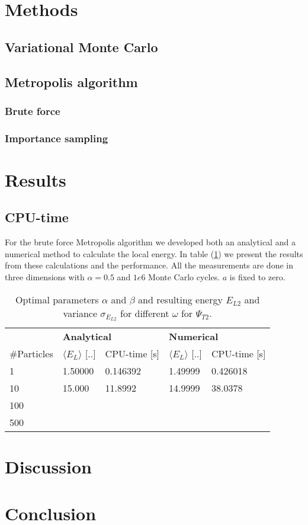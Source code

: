 \documentclass[norsk,a4paper,12pt]{article}
\begin{document}
\section{Methods}
\subsection{Variational Monte Carlo}\label{VMC}

\subsection{Metropolis algorithm}
\subsubsection{Brute force}
\subsubsection{Importance sampling}



\section{Results}
\subsection{CPU-time}\label{CPU}
For the brute force Metropolis algorithm we developed both an analytical and a numerical method to calculate the local energy. In table (\ref{tab:BFmet}) we present the results from these calculations and the performance. All the measurements are done in three dimensions with $\alpha=0.5$ and $1e6$ Monte Carlo cycles. $a$ is fixed to zero.
\begin{table} [H]
\centering
\caption{Optimal parameters $\alpha$ and $\beta$ and resulting energy $E_{L2}$ and variance $\sigma_{E_{L2}}$ for different $\omega$ for $\Psi_{T2}$.}
\begin{tabularx}{\textwidth}{X|XX|XX} \hline
\label{tab:BFmet}
& \multicolumn{2}{X}{\textbf{Analytical}} & \multicolumn{2}{X}{\textbf{Numerical}} \\
\#Particles & $\langle E_L\rangle$ [..] & CPU-time [s] & $\langle E_L\rangle$ [..] & CPU-time [s]\\ \hline
1 & 1.50000 & 0.146392 & 1.49999 & 0.426018 \\
10 & 15.000 & 11.8992 & 14.9999 & 38.0378 \\
100 & & & & \\
500 & & & & \\ \hline
\end{tabularx}
\end{table}

\section{Discussion}

\section{Conclusion}
\end{document}
